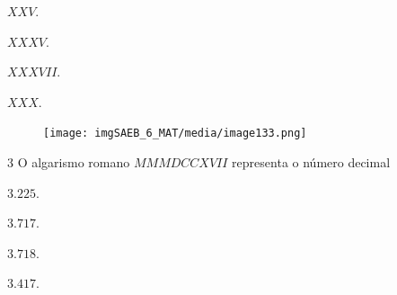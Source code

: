 \begin{escolha}
\item $XXV$.
\item $XXXV$.
\item $XXXVII$.
\item $XXX$.
\end{escolha}

\begin{figure}[H]
\texttt{[image: imgSAEB\_6\_MAT/media/image133.png]}
\end{figure}




\num{3}  O algarismo romano $MMMDCCXVII$ representa o número decimal

\begin{escolha}
\item $3.225$.
\item $3.717$.
\item $3.718$.
\item $3.417$.
\end{escolha}



